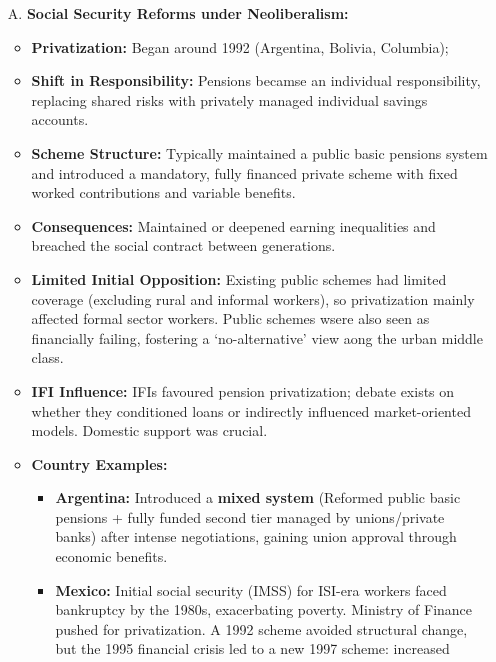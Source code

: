 \documentclass{article}
\begin{document}
    \begin{itemize}
        \item [A.] \textbf{Social Security Reforms under Neoliberalism:}
        \begin{itemize}
            \item \textbf{Privatization:} Began around 1992 (Argentina,
            Bolivia, Columbia);
            \item \textbf{Shift in Responsibility:} Pensions becamse an
            individual responsibility, replacing shared risks with privately
            managed individual savings accounts.
            \item \textbf{Scheme Structure:} Typically maintained a public
            basic pensions system and introduced a mandatory, fully financed
            private scheme with fixed worked contributions and variable
            benefits.
            \item \textbf{Consequences:} Maintained or deepened earning
            inequalities and breached the social contract between generations.
            \item \textbf{Limited Initial Opposition:} Existing public
            schemes had limited coverage (excluding rural and informal
            workers), so privatization mainly affected formal sector
            workers. Public schemes wsere also seen as financially failing,
            fostering a `no-alternative' view aong the urban middle class.
            \item \textbf{IFI Influence:} IFIs favoured pension
            privatization; debate exists on whether they conditioned loans
            or indirectly influenced market-oriented models. Domestic
            support was crucial.
            \item \textbf{Country Examples:}
            \begin{itemize}
                \item \textbf{Argentina:} Introduced a \textbf{mixed system} (Reformed public basic pensions + fully funded second tier managed by unions/private banks) after intense negotiations, gaining union approval through economic benefits.
                \item \textbf{Mexico:} Initial social security (IMSS) for
                ISI-era workers faced bankruptcy by the 1980s, exacerbating
                poverty. Ministry of Finance pushed for privatization. A
                1992 scheme avoided structural change, but the 1995
                financial crisis led to a new 1997 scheme: increased

\end{itemize}
\end{itemize}
\end{itemize}
\end{document}

